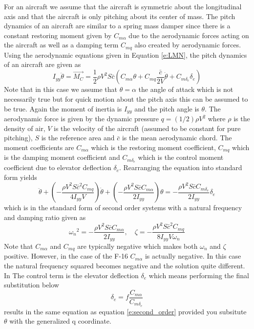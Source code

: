 For an aircraft we assume that the aircraft is symmetric about the longitudinal axis and that the aircraft is only pitching about its center of mass. The pitch dynamics of an aircraft are similar to a spring mass damper since there is a constant restoring moment given by $C_{m\alpha}$ due to the aerodynamic forces acting on the aircraft as well as a damping term $C_{mq}$ also created by aerodynamic forces. Using the aerodynamic equations given in Equation \ref{e:LMN}, the pitch dynamics of an aircraft are given as
\begin{equation}
    I_{yy}\ddot{\theta} = \vec{M_C} = \frac{1}{2}\rho V^2 S \bar{c} (C_{m\alpha}\theta + C_{mq}\frac{\bar{c}}{2V}\dot{\theta} + C_{m\delta_e}\delta_e)
\end{equation}
Note that in this case we assume that $\theta=\alpha$ the angle of attack which is not necessarily true but for quick motion about the pitch axis this can be assumed to be true. Again the moment of inertia is $I_{yy}$ and the pitch angle is $\theta$. The aerodynamic force is given by the dynamic pressure $q = (1/2)\rho V^2$ where $\rho$ is the density of air, $V$ is the velocity of the aircraft (assumed to be constant for pure pitching), $S$ is the reference area and $\bar{c}$ is the mean aerodynamic chord. The moment coefficients are $C_{m\alpha}$ which is the restoring moment coefficient, $C_{mq}$ which is the damping moment coefficient and $C_{m\delta_e}$ which is the control moment coefficient due to elevator deflection $\delta_e$. Rearranging the equation into standard form yields
\begin{equation}
    \ddot{\theta} + \left(-\frac{\rho V^2 S \bar{c}^2 C_{mq}}{4I_{yy} V}\right)\dot{\theta} + \left(-\frac{\rho V^2 S \bar{c} C_{m\alpha}}{2I_{yy}}\right)\theta = -\frac{\rho V^2 S \bar{c} C_{m\delta_e}}{2I_{yy}}\delta_e
\end{equation}
which is in the standard form of second order systems with a natural frequency and damping ratio given as 
\begin{equation}
    {\omega_n}^2 = -\frac{\rho V^2 S \bar{c} C_{m\alpha}}{2I_{yy}}, \quad \zeta = -\frac{\rho V^2 S \bar{c}^2 C_{mq}}{8I_{yy} V {\omega_n}}
\end{equation}
Note that $C_{m\alpha}$ and $C_{mq}$ are typically negative which makes both $\omega_n$ and $\zeta$ positive. However, in the case of the F-16 $C_{m\alpha}$ is actually negative. In this case the natural frequency squared becomes negative and the solution quite different. In The control term is the elevator deflection $\delta_e$ which means performing the final substitution below
\begin{equation}
    \delta_e = f \frac{C_{m\alpha}}{C_{m\delta_e}}
\end{equation}
results in the same equation as equation \ref{e:second_order} provided you subsitute $\theta$ with the generalized q coordinate. 

